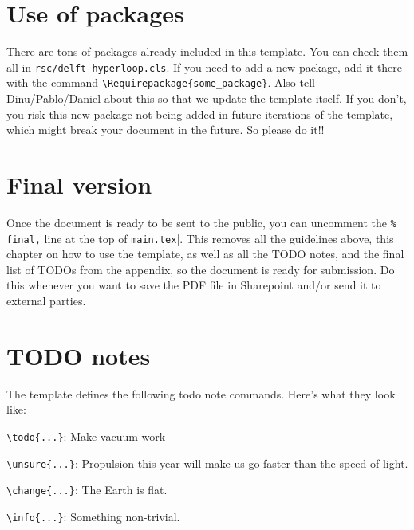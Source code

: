 \section*{Use of packages}

There are tons of packages already included in this template. You can check them all in \verb|rsc/delft-hyperloop.cls|. If you need to add a new package, add it there with the command \verb|\Requirepackage{some_package}|. Also tell Dinu/Pablo/Daniel about this so that we update the template itself. If you don't, you risk this new package not being added in future iterations of the template, which might break your document in the future. So please do it!!

\section*{Final version}

Once the document is ready to be sent to the public, you can uncomment the \verb|% final,| line at the top of \verb|main.tex||. This removes all the guidelines above, this chapter on how to use the template, as well as all the TODO notes, and the final list of TODOs from the appendix, so the document is ready for submission. Do this whenever you want to save the PDF file in Sharepoint and/or send it to external parties.


\section*{TODO notes}

The template defines the following todo note commands. Here's what they look like:

\vspace{5em}

\verb|\todo{...}|: Make vacuum work 

\vspace{5em}

\verb|\unsure{...}|: Propulsion this year will make us go faster than the speed of light. 

\vspace{5em}

\verb|\change{...}|: The Earth is flat. 

\vspace{5em}

\verb|\info{...}|: Something non-trivial. 

